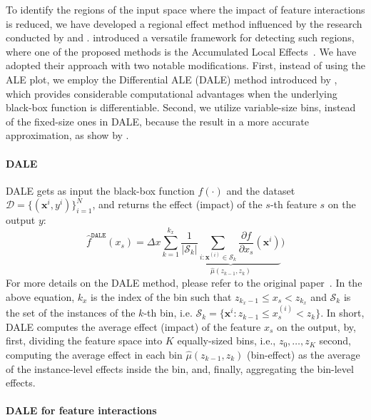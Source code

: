 \documentclass[runningheads]{llncs}
\newcommand{\dfdx}{\frac{\partial f}{\partial x_s}}
\newcommand{\xb}{\mathbf{x}}
\begin{document}
To identify the regions of the input space where the impact of feature interactions is reduced,
we have developed a regional effect method influenced by the research conducted by
\citet{herbinger2023decomposing} and \citet{gkolemis2023dale}.
\citet{herbinger2023decomposing} introduced a versatile framework for detecting such regions,
where one of the proposed methods is the Accumulated Local Effects~\citep{apley2020visualizing}.
We have adopted their approach with two notable modifications.
First, instead of using the ALE plot, we employ the Differential ALE (DALE) method introduced by \citet{gkolemis2023dale},
which provides considerable computational advantages when the underlying black-box function is differentiable.
Second, we utilize variable-size bins, instead of the fixed-size ones in DALE, because the result in a more accurate approximation, as show by \citet{gkolemis2023rhale}.

\paragraph{DALE}

DALE gets as input the black-box function \(f(\cdot)\)
and the dataset \(\mathcal{D} = \{(\xb^i, y^i)\}_{i=1}^N\),
and returns the effect (impact) of the $s$-th feature $s$ on the output $y$:
%
\begin{equation}  \label{eq:DALE_accumulated_mean_est}
  \hat{f}^{\mathtt{DALE}}(x_s) = \Delta x \sum_{k=1}^{k_x} \underbrace{\frac{1}{|\mathcal{S}_k|} \sum_{i:\mathbf{x}^{(i)} \in
    \mathcal{S}_k} \dfdx(\mathbf{x}^i)}_{\hat{\mu}(z_{k-1}, z_k)})
\end{equation}
%
For more details on the DALE method, please refer to the original paper~\citep{gkolemis2023dale}.
In the above equation, \(k_x\) is the index of the bin such that
\(z_{k_x-1} \leq x_s < z_{k_x} \) and \(\mathcal{S}_k\)
is the set of the instances of the \(k\)-th bin, i.e.
\( \mathcal{S}_k = \{ \xb^i : z_{k-1} \leq x^{(i)}_s < z_{k} \} \).
In short, DALE computes the average effect (impact) of the feature \(x_s\) on the output,
by, first, dividing the feature space into $K$ equally-sized bins, i.e., \(z_0, \ldots, z_K\)
second, computing the average effect in each bin \(\hat{\mu}(z_{k-1}, z_k)\) (bin-effect) as the average of the instance-level effects inside the bin,
and, finally, aggregating the bin-level effects.

\paragraph{DALE for feature interactions}
\end{document}
